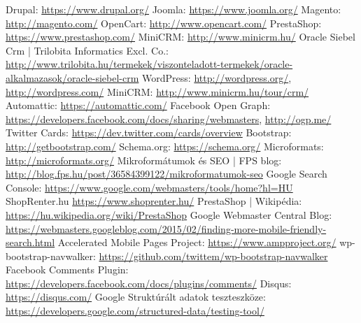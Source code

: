 \begin{thebibliography}{x}
	 Drupal: \url{https://www.drupal.org/}
	 Joomla: \url{https://www.joomla.org/}
	 Magento: \url{http://magento.com/}
	 OpenCart: \url{http://www.opencart.com/}
	 PrestaShop: \url{https://www.prestashop.com/}
	 MiniCRM: \url{http://www.minicrm.hu/}
	 Oracle Siebel Crm | Trilobita Informatics Excl. Co.: \url{http://www.trilobita.hu/termekek/viszonteladott-termekek/oracle-alkalmazasok/oracle-siebel-crm}
	 WordPress: \url{http://wordpress.org/}, \url{http://wordpress.com/}
	 MiniCRM: \url{http://www.minicrm.hu/tour/crm/}
	 Automattic: \url{https://automattic.com/}
	 Facebook Open Graph: \url{https://developers.facebook.com/docs/sharing/webmasters}, \url{http://ogp.me/}
	 Twitter Cards: \url{https://dev.twitter.com/cards/overview}
	 Bootstrap: \url{http://getbootstrap.com/}
	 Schema.org: \url{https://schema.org/}
	 Microformats: \url{http://microformats.org/}
	 Mikroformátumok és SEO | FPS blog: \url{http://blog.fps.hu/post/36584399122/mikroformatumok-seo}
	 Google Search Console: \url{https://www.google.com/webmasters/tools/home?hl=HU}
	 ShopRenter.hu \url{https://www.shoprenter.hu/}
	 PrestaShop | Wikipédia: \url{https://hu.wikipedia.org/wiki/PrestaShop}
	 Google Webmaster Central Blog: \url{https://webmasters.googleblog.com/2015/02/finding-more-mobile-friendly-search.html}
	 Accelerated Mobile Pages Project: \url{https://www.ampproject.org/}
	 wp-bootstrap-navwalker: \url{https://github.com/twittem/wp-bootstrap-navwalker}
	 Facebook Comments Plugin: \url{https://developers.facebook.com/docs/plugins/comments/}
	 Disqus: \url{https://disqus.com/}
	 Google Struktúrált adatok teszteszköze: \url{https://developers.google.com/structured-data/testing-tool/}
\end{thebibliography}